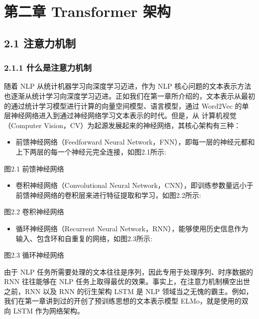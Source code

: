 \documentclass[
]{article}
\author{}
\date{}
\providecommand{\tightlist}{%
  \setlength{\itemsep}{0pt}\setlength{\parskip}{0pt}}
\begin{document}
{
\setcounter{tocdepth}{3}
\tableofcontents
}
\section{第二章 Transformer
架构}\label{ux7b2cux4e8cux7ae0-transformer-ux67b6ux6784}

\subsection{2.1 注意力机制}\label{ux6ce8ux610fux529bux673aux5236}

\subsubsection{2.1.1
什么是注意力机制}\label{ux4ec0ux4e48ux662fux6ce8ux610fux529bux673aux5236}

随着 NLP 从统计机器学习向深度学习迈进，作为 NLP
核心问题的文本表示方法也逐渐从统计学习向深度学习迈进。正如我们在第一章所介绍的，文本表示从最初的通过统计学习模型进行计算的向量空间模型、语言模型，通过
Word2Vec 的单层神经网络进入到通过神经网络学习文本表示的时代。但是，从
计算机视觉（Computer
Vision，CV）为起源发展起来的神经网络，其核心架构有三种：

\begin{itemize}
\tightlist
\item
  前馈神经网络（Feedforward Neural
  Network，FNN），即每一层的神经元都和上下两层的每一个神经元完全连接，如图2.1所示:
\end{itemize}

图2.1 前馈神经网络

\begin{itemize}
\tightlist
\item
  卷积神经网络（Convolutional Neural
  Network，CNN），即训练参数量远小于前馈神经网络的卷积层来进行特征提取和学习，如图2.2所示:
\end{itemize}

图2.2 卷积神经网络

\begin{itemize}
\tightlist
\item
  循环神经网络（Recurrent Neural
  Network，RNN），能够使用历史信息作为输入、包含环和自重复的网络，如图2.3所示:
\end{itemize}

图2.3 循环神经网络

由于 NLP 任务所需要处理的文本往往是序列，因此专用于处理序列、时序数据的
RNN 往往能够在 NLP
任务上取得最优的效果。事实上，在注意力机制横空出世之前，RNN 以及 RNN
的衍生架构 LSTM 是 NLP
领域当之无愧的霸主。例如，我们在第一章讲到过的开创了预训练思想的文本表示模型
ELMo，就是使用的双向 LSTM 作为网络架构。
\end{document}
